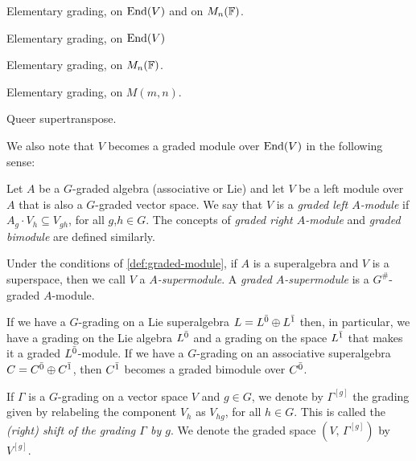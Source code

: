 \begin{defi}\label{defi:elementary-grd}
    Elementary grading, on $\operatorname{End}(V)$ and on $M_n(\mathbb{F})$.
\end{defi}

\begin{defi}\label{defi:elementary-grd-abstract}
    Elementary grading, on $\operatorname{End}(V)$
\end{defi}

\begin{defi}\label{defi:elementary-grd-matrix}
    Elementary grading, on $M_n(\mathbb{F})$.
\end{defi}

\begin{defi}\label{defi:elementary-grd-super}
    Elementary grading, on $M(m,n)$.
\end{defi}

\begin{defi}\label{def:queer-stp}
    Queer supertranspose.
\end{defi}

We also note that $V$ becomes a graded module over $\operatorname{End}(V)$ in the following sense:

\begin{defi}\label{def:graded-module}
	Let $A$ be a $G$-graded algebra (associative or Lie) and let $V$ be a left module over $A$ that is also a $G$-graded vector space. 
	We say that $V$ is a \emph{graded left $A$-module} if $A_g \cdot V_h \subseteq V_{gh}$, for all $g$,$h\in G$. 
	The concepts of \emph{graded right $A$-module} and \emph{graded bimodule} are defined similarly.
\end{defi}

Under the conditions of \cref{def:graded-module}, if $A$ is a superalgebra and $V$ is a superspace, then we call $V$ a \emph{$A$-supermodule}. 
A \emph{graded $A$-supermodule} is a $G^\#$-graded $A$-module.

If we have a $G$-grading on a Lie superalgebra $L=L^{\bar0} \oplus L^{\bar1}$ then, in particular, we have a grading on the Lie algebra $L^{\bar0}$ and a grading on the space $L^{\bar1}$ that makes it a graded $L^{\bar0}$-module. If we have a $G$-grading on an associative superalgebra $C=C^{\bar0} \oplus C^{\bar1}$, then $C^{\bar1}$ becomes a graded bimodule over $C^{\bar0}$.

If $ \Gamma$ is a $G$-grading on a vector space $V$ and $g\in G$, we denote by $\Gamma^{[g]} $ the grading given by relabeling the component
$V_h$ as $V_{hg}$, for all $h \in G$. This is called the \emph{(right) shift of the grading $\Gamma$ by $g$}.
We denote the graded space $(V, \,  \Gamma^{[g]})$ by $V^{[g]}$.

